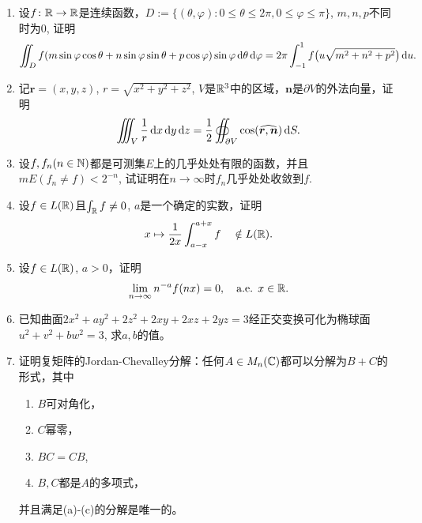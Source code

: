 \begin{enumerate}
    \item 设$f\colon \mathbb{R}\to\mathbb{R}$是连续函数，$D:=\{(\theta,\varphi)\colon 0\leqslant \theta\leqslant 2\pi,0\leqslant \varphi\leqslant \pi\}$, $m,n,p$不同时为0, 证明
    \begin{equation*}
        \iint_D f(m\sin\varphi\cos \theta+n\sin\varphi\sin\theta+p\cos\varphi)\sin\varphi\mathop{}\!\mathrm{d} \theta\mathop{}\!\mathrm{d} \varphi=2\pi\int_{-1}^{1}f\bigl(u\sqrt{m^2+n^2+p^2}\bigr)\mathop{}\!\mathrm{d} u.
    \end{equation*}
    \item 记$\boldsymbol{r}=(x,y,z)$, $r=\sqrt{x^2+y^2+z^2}$, $V$是$\mathbb{R}^3$中的区域，$\boldsymbol{n}$是$\partial V$的外法向量，证明
    \begin{equation*}
        \iiint_V \frac{1}{r}\mathop{}\!\mathrm{d} x\mathop{}\!\mathrm{d} y\mathop{}\!\mathrm{d} z=\frac{1}{2}\oiint_{\partial V}\cos (\widehat{\boldsymbol{r},\boldsymbol{n}})\mathop{}\!\mathrm{d} S.
    \end{equation*}
    \item 设$f,f_n(n\in\mathbb{N})$都是可测集$E$上的几乎处处有限的函数，并且$mE(f_n\neq f)<2^{-n}$, 试证明在$n\to \infty$时$f_n$几乎处处收敛到$f$.
    \item 设$f\in L(\mathbb{R})$且$\int_{\mathbb{R}} f \neq 0$, $a$是一个确定的实数，证明
    \begin{equation*}
        x\mapsto \frac{1}{2x}\int_{a-x}^{a+x}f\quad\notin L(\mathbb{R}).
    \end{equation*}
    \item 设$f\in L(\mathbb{R})$, $a>0$，证明
    \begin{equation*}
        \lim_{n\to \infty}n^{-a}f(nx)=0,\quad\text{a.e. }x\in \mathbb{R}.
    \end{equation*}
    \item 已知曲面$2x^2+ay^2+2z^2+2xy+2xz+2yz=3$经正交变换可化为椭球面$u^2+v^2+bw^2=3$, 求$a,b$的值。
    \item 证明复矩阵的Jordan-Chevalley分解：任何$A\in M_n(\mathbb{C})$都可以分解为$B+C$的形式，其中
    \begin{enumerate}
        \item $B$可对角化，
        \item $C$幂零，
        \item $BC=CB$,
        \item $B,C$都是$A$的多项式，
    \end{enumerate}
    并且满足(a)-(c)的分解是唯一的。
\end{enumerate}